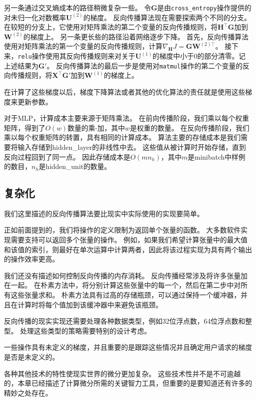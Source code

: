 另一条通过交叉熵成本的路径稍微复杂一些。
令$\bm{G}$是由\verb|cross_entropy|操作提供的对未归一化对数概率$\bm{U}^{(2)}$的梯度。
反向传播算法现在需要探索两个不同的分支。
在较短的分支上，它使用对矩阵乘法的第二个变量的反向传播规则，将$\bm{H}^\top \bm{G}$加到$\bm{W}^{(2)}$的梯度上。
另一条更长些的路径沿着网络逐步下降。
首先，反向传播算法使用对矩阵乘法的第一个变量的反向传播规则，计算$\nabla_{\bm{H}} J = \bm{G}\bm{W}^{(2)\top}$。
接下来，\verb|relu|操作使用其反向传播规则来对关于$\bm{U}^{(1)}$的梯度中小于0的部分清零。记上述结果为$\bm{G}'$。 
反向传播算法的最后一步是使用对\verb|matmul|操作的第二个变量的反向传播规则，将$\bm{X}^\top \bm{G}'$加到$\bm{W}^{(1)}$的梯度上。

在计算了这些梯度以后，梯度下降算法或者其他的优化算法的责任就是使用这些梯度来更新参数。

对于MLP，计算成本主要来源于矩阵乘法。
在前向传播阶段，我们乘以每个权重矩阵，得到了$O(w)$数量的乘-加，其中$w$是权重的数量。
在反向传播阶段，我们乘以每个权重矩阵的转置，具有相同的计算成本。
算法主要的存储成本是我们需要将输入存储到\gls{hidden_layer}的非线性中去。
这些值从被计算时开始存储，直到反向过程回到了同一点。
因此存储成本是$O(mn_h)$，其中$m$是minibatch中样例的数目，$n_h$是\gls{hidden_unit}的数量。
  
  
\subsection{复杂化}
\label{sec:complications}

我们这里描述的反向传播算法要比现实中实际使用的实现要简单。

正如前面提到的，我们将操作的定义限制为返回单个张量的函数。
大多数软件实现需要支持可以返回多个张量的操作。 
例如，如果我们希望计算张量中的最大值和该值的索引，则最好在单次运算中计算两者，因此将该过程实现为具有两个输出的操作效率更高。

我们还没有描述如何控制反向传播的内存消耗。
反向传播经常涉及将许多张量加在一起。
在朴素方法中，将分别计算这些张量中的每一个，然后在第二步中对所有这些张量求和。 
朴素方法具有过高的存储瓶颈，可以通过保持一个缓冲器，并且在计算时将每个值加到该缓冲器中来避免该瓶颈。

反向传播的现实实现还需要处理各种数据类型，例如32位浮点数，64位浮点数和整型。
处理这些类型的策略需要特别的设计考虑。

一些操作具有未定义的梯度，并且重要的是跟踪这些情况并且确定用户请求的梯度是否是未定义的。

各种其他技术的特性使现实世界的微分更加复杂。 这些技术性并不是不可逾越的，本章已经描述了计算微分所需的关键智力工具，但重要的是要知道还有许多的精妙之处存在。
  
